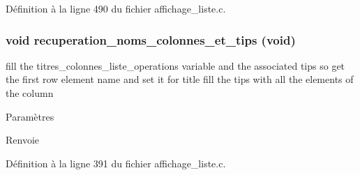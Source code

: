 Définition à la ligne 490 du fichier affichage\_\-liste.c.

\subsubsection[{recuperation\_\-noms\_\-colonnes\_\-et\_\-tips}]{\setlength{\rightskip}{0pt plus 5cm}void recuperation\_\-noms\_\-colonnes\_\-et\_\-tips (void)}\label{affichage__liste_8h_a0c0358b4457dcb87adf267e8fd04d971}
fill the titres\_\-colonnes\_\-liste\_\-operations variable and the associated tips so get the first row element name and set it for title fill the tips with all the elements of the column


\begin{DoxyParams}{Paramètres}
\item[{\em }]\end{DoxyParams}
\begin{DoxyReturn}{Renvoie}

\end{DoxyReturn}


Définition à la ligne 391 du fichier affichage\_\-liste.c.

